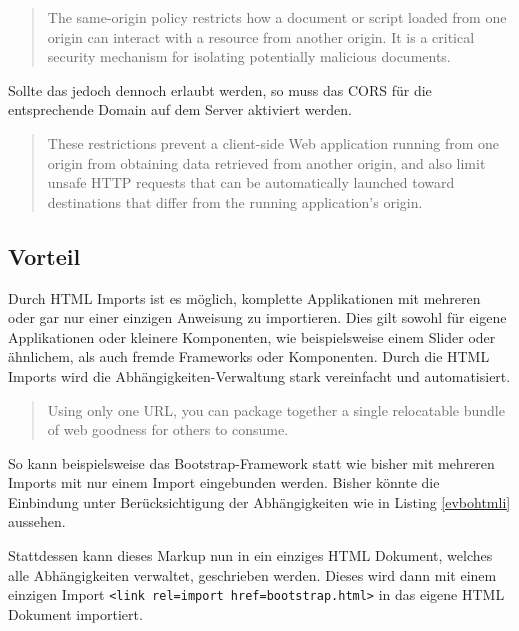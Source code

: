 \begin{quote}
The same-origin policy restricts how a document or script loaded from one origin can interact with a resource from another origin. It is a critical security mechanism for isolating potentially malicious documents. \cite{citeulike:13853253}
\end{quote}

Sollte das jedoch dennoch erlaubt werden, so muss das \ac{CORS} für die entsprechende Domain auf dem Server aktiviert werden.

\begin{quote}
These restrictions prevent a client-side Web application running from one origin from obtaining data retrieved from another origin, and also limit unsafe \ac{HTTP} requests that can be automatically launched toward destinations that differ from the running application's origin. \cite{citeulike:13853643}
\end{quote}


\subsection{Vorteil}\label{vorteil}

Durch \ac{HTML} Imports ist es möglich, komplette Applikationen mit mehreren oder gar nur einer einzigen Anweisung zu importieren. Dies gilt sowohl für eigene Applikationen oder kleinere Komponenten, wie beispielsweise einem Slider oder ähnlichem, als auch fremde Frameworks oder Komponenten. Durch die \ac{HTML} Imports wird die Abhängigkeiten-Verwaltung stark vereinfacht und automatisiert.

\begin{quote}
Using only one URL, you can package together a single relocatable bundle of web goodness for others to consume. \cite{citeulike:13853647}
\end{quote}

So kann beispielsweise das Bootstrap-Framework statt wie bisher mit mehreren Imports mit nur einem Import eingebunden werden. Bisher könnte die Einbindung unter Berücksichtigung der Abhängigkeiten wie in Listing \ref{evbohtmli} aussehen.



Stattdessen kann dieses Markup nun in ein einziges \ac{HTML} Dokument, welches alle Abhängigkeiten verwaltet, geschrieben werden. Dieses wird dann mit einem einzigen Import \texttt{\textless{}link\ rel=\dq import\dq\ href=\dq bootstrap.html\dq\textgreater{}} in das eigene \ac{HTML} Dokument importiert.


